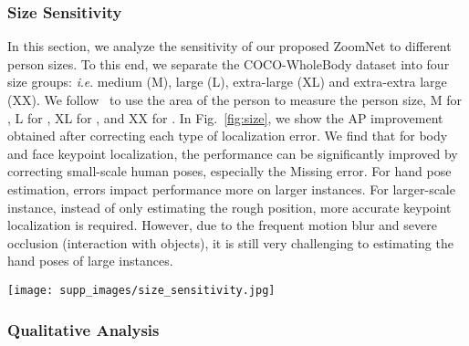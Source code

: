 \documentclass[runningheads]{llncs}
\newcommand{\ie}{\textit{i}.\textit{e}. }
\begin{document}
	
	
	\subsubsection{Size Sensitivity}
	In this section, we analyze the sensitivity of our proposed ZoomNet to different person sizes. To this end, we separate the COCO-WholeBody dataset into four size groups: \ie medium (M), large (L), extra-large (XL) and extra-extra large (XX). We follow~\cite{Ronchi2017Benchmarking} to use the area of the person to measure the person size, M for , L for , XL for , and XX for . In Fig.~\ref{fig:size}, we show the AP improvement obtained after correcting each type of localization error. We find that for body and face keypoint localization, the performance can be significantly improved by correcting small-scale human poses, especially the Missing error. For hand pose estimation, errors impact performance more on larger instances. For larger-scale instance, instead of only estimating the rough position, more accurate keypoint localization is required. However, due to the frequent motion blur and severe occlusion (interaction with objects), it is still very challenging to estimating the hand poses of large instances.
	
	
	\begin{figure*}[tb]
		\centering
		\texttt{[image: supp\_images/size\_sensitivity.jpg]}
		\caption{The AP improvement obtained by correcting each type of error (including Miss, Swap, Inversion, and Jitter) for body, face, and hand separately. We use the dashed red lines to indicate performance improvement over all the instance sizes.}
		\label{fig:size}
	\end{figure*}
	
	\subsubsection{Qualitative Analysis}
	
\end{document}
